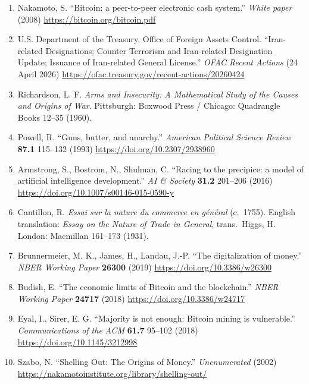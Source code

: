 \documentclass[12pt]{article}
\theoremstyle{definition}
\theoremstyle{remark}
\begin{document}
\begin{enumerate}[leftmargin=*,labelsep=0.5em,label=\arabic*.]

\item Nakamoto, S. ``Bitcoin: a peer-to-peer electronic cash
system.'' \emph{White paper} (2008)
\url{https://bitcoin.org/bitcoin.pdf}

\item U.S. Department of the Treasury, Office of Foreign Assets
Control. ``Iran-related Designations; Counter Terrorism and
Iran-related Designation Update; Issuance of Iran-related General
License.'' \emph{OFAC Recent Actions} (24 April 2026)
\url{https://ofac.treasury.gov/recent-actions/20260424}

\item Richardson, L. F. \emph{Arms and Insecurity: A Mathematical
Study of the Causes and Origins of War}. Pittsburgh: Boxwood
Press / Chicago: Quadrangle Books 12--35 (1960).

\item Powell, R. ``Guns, butter, and anarchy.'' \emph{American
Political Science Review} \textbf{87.1} 115--132 (1993)
\url{https://doi.org/10.2307/2938960}

\item Armstrong, S., Bostrom, N., Shulman, C. ``Racing to the
precipice: a model of artificial intelligence development.''
\emph{AI \& Society} \textbf{31.2} 201--206 (2016)
\url{https://doi.org/10.1007/s00146-015-0590-y}

\item Cantillon, R. \emph{Essai sur la nature du commerce en
g\'en\'eral} (c.~1755). English translation: \emph{Essay on the Nature
of Trade in General}, trans.\ Higgs, H. London: Macmillan 161--173 (1931).

\item Brunnermeier, M. K., James, H., Landau, J.-P. ``The
digitalization of money.'' \emph{NBER Working Paper}
\textbf{26300} (2019) \url{https://doi.org/10.3386/w26300}

\item Budish, E. ``The economic limits of Bitcoin and the
blockchain.'' \emph{NBER Working Paper} \textbf{24717} (2018)
\url{https://doi.org/10.3386/w24717}

\item Eyal, I., Sirer, E. G. ``Majority is not enough: Bitcoin
mining is vulnerable.'' \emph{Communications of the ACM}
\textbf{61.7} 95--102 (2018)
\url{https://doi.org/10.1145/3212998}

\item Szabo, N. ``Shelling Out: The Origins of Money.''
\emph{Unenumerated} (2002)
\url{https://nakamotoinstitute.org/library/shelling-out/}


\end{enumerate}
\end{document}
